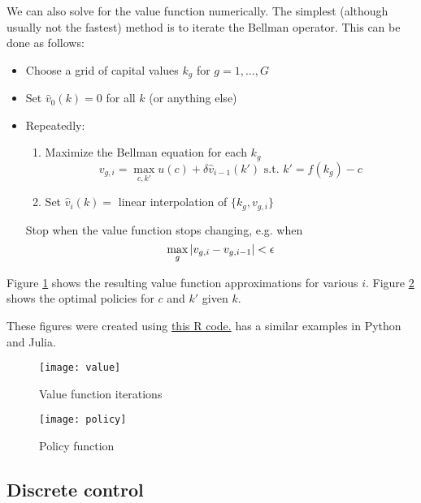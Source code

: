 \begin{example} 
  We can also solve for the value function numerically. The simplest
  (although usually not the fastest) method is to iterate the Bellman
  operator. This can be done as follows:
  \begin{itemize}
  \item Choose a grid of capital values $k_g$ for $g=1,..., G$
  \item Set $\hat{v}_0(k) = 0$ for all $k$ (or anything else)
  \item Repeatedly:
    \begin{enumerate}
    \item Maximize the Bellman equation for each $k_g$
      \[ v_{g,i} = \max_{c,k'} u(c) + \delta \hat{v}_{i-1}(k') \text{ s.t. } k' = f(k_g)
      - c \]
    \item Set $\hat{v}_{i} (k) = $ linear interpolation of $\{k_g,
      v_{g,i} \}$
    \end{enumerate}
    Stop when the value function stops changing, e.g. when 
    \[ \max_{g} \left\vert {v_{g,i} - v_{g,i-1} } \right\vert < \epsilon \]
  \end{itemize}
  
  Figure \ref{fig:value} shows the resulting value function
  approximations for various $i$.  Figure \ref{fig:policy} shows the
  optimal policies for $c$ and $k'$ given $k$. 
  
  These figures were created using
  \href{https://bitbucket.org/paulschrimpf/econ526/src/master/03-dynamicProgramming/dp.R?at=master}
  {this R code.}
  \cite{sargent2013} has a similar examples in Python and Julia.   
\end{example}

\begin{figure}\caption{Value function iterations \label{fig:value}}
  \begin{centering}
    \texttt{[image: value]}
  \end{centering}
\end{figure}

\begin{figure}\caption{Policy function \label{fig:policy}}
  \begin{centering}
    \texttt{[image: policy]}
  \end{centering}
\end{figure}

\clearpage
\subsection{Discrete control}
  
